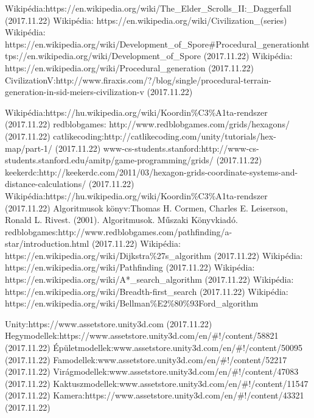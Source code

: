\begin{thebibliography}{x}

Wikipédia:\;https://en.wikipedia.org/wiki/The\_Elder\_Scrolls\_II:\_Daggerfall (2017.11.22)
 Wikipédia: https://en.wikipedia.org/wiki/Civilization\_(series)
 Wikipédia: https://en.wikipedia.org/wiki/Development\_of\_Spore\#Procedural\_generationhttps://en.wikipedia.org/wiki/Development\_of\_Spore (2017.11.22)
 Wikipédia: https://en.wikipedia.org/wiki/Procedural\_generation (2017.11.22)
Civilization\;V:\;http://www.firaxis.com/?/blog/single/procedural-terrain-generation-in-sid-meiers-civilization-v (2017.11.22)

 Wikipédia:\;https://hu.wikipedia.org/wiki/Koordin\%C3\%A1ta-rendszer (2017.11.22)
 redblobgames:\; http://www.redblobgames.com/grids/hexagons/ (2017.11.22)
 catlikecoding:\;http://catlikecoding.com/unity/tutorials/hex-map/part-1/ (2017.11.22)
 www-cs-students.stanford:\;http://www-cs-students.stanford.edu/$\tilde{}$amitp/game-programming/grids/ (2017.11.22)
 keekerdc:\;http://keekerdc.com/2011/03/hexagon-grids-coordinate-systems-and-distance-calculations/ (2017.11.22)
 Wikipédia:\;https://hu.wikipedia.org/wiki/Koordin\%C3\%A1ta-rendszer (2017.11.22)
 Algoritmusok könyv:\;Thomas H. Cormen, Charles E. Leiserson, Ronald L. Rivest. (2001). Algoritmusok. Műszaki Könyvkiadó.
 redblobgames:\;http://www.redblobgames.com/pathfinding/a-star/introduction.html (2017.11.22)
 Wikipédia: https://en.wikipedia.org/wiki/Dijkstra\%27s\_algorithm (2017.11.22)
 Wikipédia: https://en.wikipedia.org/wiki/Pathfinding (2017.11.22)
 Wikipédia: https://en.wikipedia.org/wiki/A*\_search\_algorithm (2017.11.22)
 Wikipédia: https://en.wikipedia.org/wiki/Breadth-first\_search (2017.11.22)
 Wikipédia: https://en.wikipedia.org/wiki/Bellman\%E2\%80\%93Ford\_algorithm

 Unity:\;https://www.assetstore.unity3d.com (2017.11.22)
 Hegy\;modellek:\;https://www.assetstore.unity3d.com/en/\#!/content/58821 (2017.11.22)
 Épület\;modellek:\;www.assetstore.unity3d.com/en/\#!/content/50095 (2017.11.22)
 Fa\;modellek:\;www.assetstore.unity3d.com/en/\#!/content/52217 (2017.11.22)
 Virág\;modellek:\;www.assetstore.unity3d.com/en/\#!/content/47083 (2017.11.22)
 Kaktusz\;modellek:\;www.assetstore.unity3d.com/en/\#!/content/11547 (2017.11.22)
 Kamera:\;https://www.assetstore.unity3d.com/en/\#!/content/43321 (2017.11.22)


\end{thebibliography}

